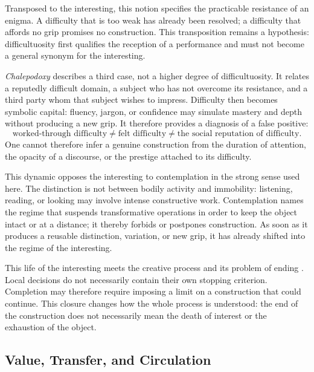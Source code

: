 \documentclass[11pt,a4paper]{article}
\begin{document}
Transposed to the interesting, this notion specifies the practicable resistance
of an enigma. A difficulty that is too weak has already been resolved; a
difficulty that affords no grip promises no construction. This transposition
remains a hypothesis: difficultuosity first qualifies the reception of a
performance and must not become a general synonym for the interesting.

\emph{Chalepodoxy} describes a third case, not a higher degree of
difficultuosity. It relates a reputedly difficult domain, a subject who has not
overcome its resistance, and a third party whom that subject wishes to impress.
Difficulty then becomes symbolic capital: fluency, jargon, or confidence may
simulate mastery and depth without producing a new grip. It therefore provides
a diagnosis of a false positive:
\[
  \text{worked-through difficulty}
  \neq \text{felt difficulty}
  \neq \text{the social reputation of difficulty}.
\]
One cannot therefore infer a genuine construction from the duration of
attention, the opacity of a discourse, or the prestige attached to its
difficulty.

This dynamic opposes the interesting to contemplation in the strong sense used
here. The distinction is not between bodily activity and immobility: listening,
reading, or looking may involve intense constructive work. Contemplation names
the regime that suspends transformative operations in order to keep the object
intact or at a distance; it thereby forbids or postpones construction. As soon
as it produces a reusable distinction, variation, or new grip, it has already
shifted into the regime of the interesting.

This life of the interesting meets the creative process and its problem of
ending \parencite{pachet2026impossibilite}. Local decisions do not necessarily
contain their own stopping criterion. Completion may therefore require imposing
a limit on a construction that could continue. This closure changes how the
whole process is understood: the end of the construction does not
necessarily mean the death of interest or the exhaustion of the object.

\subsection{Value, Transfer, and Circulation}
\end{document}
